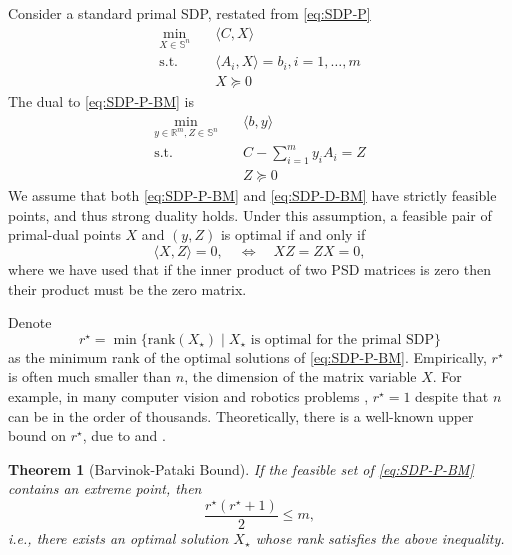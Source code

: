 \documentclass[
]{book}
\newtheorem{theorem}{Theorem}[chapter]
\theoremstyle{definition}
\theoremstyle{definition}
\theoremstyle{definition}
\theoremstyle{definition}
\theoremstyle{remark}
\begin{document}
Consider a standard primal SDP, restated from \eqref{eq:SDP-P}
\begin{equation}
\begin{split}
\min_{X \in \mathbb{S}^{n}} & \quad \langle C, X \rangle \\
\mathrm{s.t.}& \quad \langle A_i, X \rangle = b_i, i=1,\dots,m \\
& \quad X \succeq 0
\end{split}
\label{eq:SDP-P-BM}
\end{equation}
The dual to \eqref{eq:SDP-P-BM} is
\begin{equation}
\begin{split}
\min_{y \in \mathbb{R}^{m}, Z \in \mathbb{S}^{n}} & \quad \langle b, y \rangle \\
\mathrm{s.t.}& \quad C - \sum_{i=1}^m y_i A_i = Z \\
& \quad Z \succeq 0
\end{split}
\label{eq:SDP-D-BM}
\end{equation}
We assume that both \eqref{eq:SDP-P-BM} and \eqref{eq:SDP-D-BM} have strictly feasible points, and thus strong duality holds. Under this assumption, a feasible pair of primal-dual points \(X\) and \((y,Z)\) is optimal if and only if
\begin{equation}
\langle X, Z \rangle = 0, \quad \Leftrightarrow \quad XZ = ZX = 0,
\label{eq:optimal-primal-dual-pair}
\end{equation}
where we have used that if the inner product of two PSD matrices is zero then their product must be the zero matrix.

Denote
\begin{equation}
r^\star = \min\{ \mathrm{rank}(X_\star) \mid X_\star \text{ is optimal for the primal SDP} \}
\label{eq:optimal-rank}
\end{equation}
as the minimum rank of the optimal solutions of \eqref{eq:SDP-P-BM}. Empirically, \(r^\star\) is often much smaller than \(n\), the dimension of the matrix variable \(X\). For example, in many computer vision and robotics problems \citep{rosen19ijrr-sesync} \citep{yang22pami-certifiably}, \(r^\star = 1\) despite that \(n\) can be in the order of thousands. Theoretically, there is a well-known upper bound on \(r^\star\), due to \citep{barvinok95dcg-problems} and \citep{pataki98mor-rank}.

\begin{theorem}[Barvinok-Pataki Bound]
\protect\hypertarget{thm:BarvinokPataki}{}\label{thm:BarvinokPataki}If the feasible set of \eqref{eq:SDP-P-BM} contains an extreme point, then
\[
\frac{r^\star (r^\star + 1)}{2} \leq m,
\]
i.e., there exists an optimal solution \(X_\star\) whose rank satisfies the above inequality.
\end{theorem}
\end{document}
